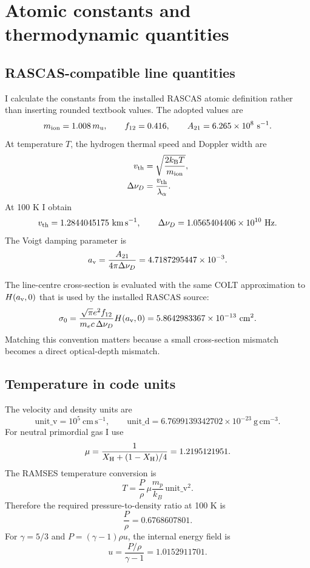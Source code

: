 \documentclass[11pt,a4paper]{article}
\newcommand{\av}{a_{\rm v}}
\newcommand{\kms}{\mathrm{km\,s^{-1}}}
\begin{document}
\section{Atomic constants and thermodynamic quantities}

\subsection{RASCAS-compatible line quantities}

I calculate the constants from the installed RASCAS atomic definition rather
than inserting rounded textbook values.  The adopted values are
\[
m_{\rm ion}=1.008\,m_{\rm u},\qquad f_{12}=0.416,\qquad
A_{21}=6.265\times10^8\ \mathrm{s^{-1}}.
\]
At temperature $T$, the hydrogen thermal speed and Doppler width are
\begin{align}
v_{\rm th} &= \sqrt{\frac{2k_{\rm B}T}{m_{\rm ion}}},\\
\Delta\nu_D &= \frac{v_{\rm th}}{\lambda_\alpha}.
\end{align}
At 100 K I obtain
\[
v_{\rm th}=1.2844045175\ \kms,
\qquad
\Delta\nu_D=1.0565404406\times10^{10}\ \mathrm{Hz}.
\]
The Voigt damping parameter is
\begin{equation}
\av=\frac{A_{21}}{4\pi\Delta\nu_D}
=4.7187295447\times10^{-3}.
\end{equation}

The line-centre cross-section is evaluated with the same COLT approximation
to $H(\av,0)$ that is used by the installed RASCAS source:
\begin{equation}
\sigma_0 = \frac{\sqrt{\pi}e^2 f_{12}}{m_e c\,\Delta\nu_D}
H(\av,0)
=5.8642983367\times10^{-13}\ \mathrm{cm^2}.
\end{equation}
Matching this convention matters because a small cross-section mismatch becomes
a direct optical-depth mismatch.

\subsection{Temperature in code units}

The velocity and density units are
\[
\mathrm{unit\_v}=10^5\ \mathrm{cm\,s^{-1}},\qquad
\mathrm{unit\_d}=6.7699139342702\times10^{-23}\ \mathrm{g\,cm^{-3}}.
\]
For neutral primordial gas I use
\begin{equation}
\mu=\frac{1}{X_{\rm H}+(1-X_{\rm H})/4}=1.2195121951.
\end{equation}
The RAMSES temperature conversion is
\begin{equation}
T=\frac{P}{\rho}\,\mu\frac{m_p}{k_B}\,\mathrm{unit\_v}^2.
\end{equation}
Therefore the required pressure-to-density ratio at 100 K is
\[
\frac{P}{\rho}=0.6768607801.
\]
For $\gamma=5/3$ and $P=(\gamma-1)\rho u$, the internal energy field is
\begin{equation}
u=\frac{P/\rho}{\gamma-1}=1.0152911701.
\label{eq:u}
\end{equation}
\end{document}

